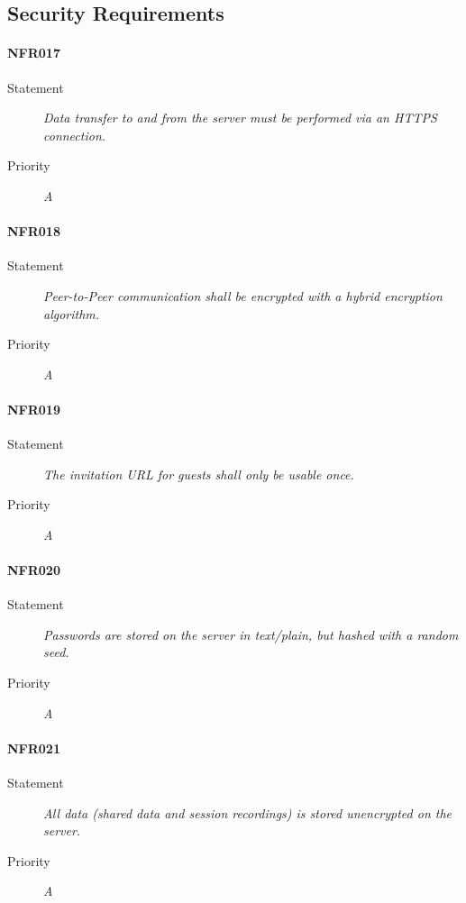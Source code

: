 \subsection{Security Requirements}
\paragraph{NFR017}
\begin{description}
\item [Statement] \textit{Data transfer to and from the server must be
    performed via an \gls{HTTPS} connection.}
\item [Priority] \textit{A}
\end{description}

\paragraph{NFR018}
\begin{description}
\item [Statement] \textit{Peer-to-Peer communication shall be encrypted with
    a hybrid encryption algorithm.}
\item [Priority] \textit{A}
\end{description}

\paragraph{NFR019}
\begin{description}
  \item [Statement] \textit{The invitation URL for guests shall only be usable once.}
  \item [Priority] \textit{A}
\end{description}

\paragraph{NFR020}
\begin{description}
\item [Statement] \textit{Passwords are stored on the server in text/plain,
    but hashed with a random seed.}
  \item [Priority] \textit{A}
\end{description}

\paragraph{NFR021}
\begin{description}
\item [Statement] \textit{All data (shared data and session recordings) is
    stored unencrypted on the server.}
\item [Priority] \textit{A}
\end{description}